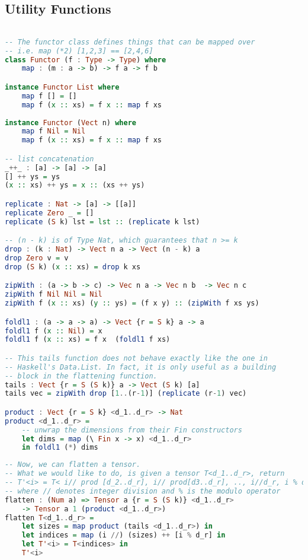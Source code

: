 \documentclass[12pt]{article}
\begin{document}
\subsection{Utility Functions}
\begin{lstlisting}[language=Haskell]

-- The functor class defines things that can be mapped over
-- i.e. map (*2) [1,2,3] == [2,4,6]
class Functor (f : Type -> Type) where
    map : (m : a -> b) -> f a -> f b

instance Functor List where
	map f [] = []
	map f (x :: xs) = f x :: map f xs
	
instance Functor (Vect n) where
	map f Nil = Nil
	map f (x :: xs) = f x :: map f xs

-- list concatenation
_++_ : [a] -> [a] -> [a]
[] ++ ys = ys
(x :: xs) ++ ys = x :: (xs ++ ys)

replicate : Nat -> [a] -> [[a]]
replicate Zero _ = []
replicate (S k) lst = lst :: (replicate k lst)

-- (n - k) is of Type Nat, which guarantees that n >= k
drop : (k : Nat) -> Vect n a -> Vect (n - k) a
drop Zero v = v
drop (S k) (x :: xs) = drop k xs

zipWith : (a -> b -> c) -> Vec n a -> Vec n b  -> Vec n c
zipWith f Nil Nil = Nil
zipWith f (x :: xs) (y :: ys) = (f x y) :: (zipWith f xs ys)

foldl1 : (a -> a -> a) -> Vect {r = S k} a -> a
foldl1 f (x :: Nil) = x
foldl1 f (x :: xs) = f x  (foldl1 f xs)

-- This tails function does not behave exactly like the one in 
-- Haskell's Data.List. In fact, it is only useful as a building 
-- block in the flattening function.
tails : Vect {r = S (S k)} a -> Vect (S k) [a]
tails vec = zipWith drop [1..(r-1)] (replicate (r-1) vec)

product : Vect {r = S k} <d_1..d_r> -> Nat
product <d_1..d_r> =  
	-- unwrap the dimensions from their Fin constructors
	let dims = map (\ Fin x -> x) <d_1..d_r> 
	in foldl1 (*) dims
\end{lstlisting}
\pagebreak
\begin{lstlisting}[language=Haskell]
-- Now, we can flatten a tensor. 
-- What we would like to do, is given a tensor T<d_1..d_r>, return 
-- T'<i> = T< i// prod [d_2..d_r], i// prod[d3..d_r], .., i//d_r, i % d_r>
-- where // denotes integer division and % is the modulo operator
flatten : (Num a) => Tensor a {r = S (S k)} <d_1..d_r> 
	-> Tensor a 1 (product <d_1..d_r>)
flatten T<d_1..d_r> = 
	let sizes = map product (tails <d_1..d_r>) in
	let indices = map (i //) (sizes) ++ [i % d_r] in
	let T'<i> = T<indices> in
	T'<i>
\end{lstlisting}
\end{document}
